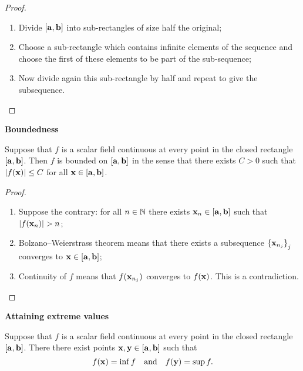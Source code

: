 \begin{proof}
    \begin{enumerate}
        \item Divide \( [\mathbf{a},\mathbf{b}]\) into sub-rectangles of size half the original;
        \item Choose a sub-rectangle which contains infinite elements of the sequence and choose the first of these elements to be part of the sub-sequence;
        \item Now divide again this sub-rectangle by half and repeat to give the subsequence.
    \end{enumerate}
\end{proof}



\textbf{Boundedness}

\begin{theorem}
    Suppose that \(f\) is a scalar field continuous at every point in the closed rectangle \([\mathbf{a},\mathbf{b}]\).
    Then \(f\) is bounded on \([\mathbf{a},\mathbf{b}]\) in the sense that there exists \(C>0\) such that \(\left|f(\mathbf{x})\right| \leq C\) for all \(\mathbf{x} \in [\mathbf{a},\mathbf{b}]\).
\end{theorem}


\begin{proof}
    \begin{enumerate}
        \item Suppose the contrary: for all \(n\in\mathbb{N}\) there exists \(\mathbf{x}_n\in [\mathbf{a},\mathbf{b}]\) such that \(\abs{f(\xx_n)}>n\);
        \item Bolzano–Weierstrass theorem means that there exists a subsequence \({\{\mathbf{x}_{n_j}\}}_{j}\) converges to \( \mathbf{x} \in [\mathbf{a},\mathbf{b}]\);
        \item Continuity of \(f\) means that \(f(\mathbf{x}_{n_j})\) converges to \(f(\mathbf{x})\). This is a contradiction.
    \end{enumerate}
\end{proof}




\textbf{Attaining extreme values}

\begin{theorem}
    Suppose that \(f\) is a scalar field continuous at every point in the closed rectangle \([\mathbf{a},\mathbf{b}]\).
    There there exist points \( \mathbf{x}, \mathbf{y} \in [\mathbf{a},\mathbf{b}]\) such that
    \[
        f(\mathbf{x}) = \inf f
        \quad \text{and} \quad
        f(\mathbf{y})= \sup f.
    \]
\end{theorem}

